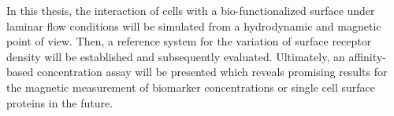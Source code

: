 In this thesis, the interaction of cells with a bio-functionalized surface under laminar flow conditions will be simulated from a hydrodynamic and magnetic point of view. Then, a reference system for the variation of surface receptor density will be established and subsequently evaluated. Ultimately, an affinity-based concentration assay will be presented which reveals promising results for the magnetic measurement of biomarker concentrations or single cell surface proteins in the future.
